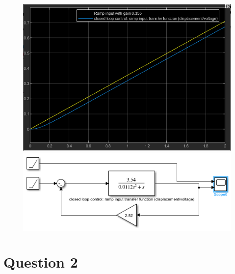 \documentclass[conference]{IEEEtran}
\begin{document}
\begin{figure}[htbp]
    \centering
    \begin{minipage}[b]{0.24\textwidth}
        \includegraphics[width=\textwidth]{./Graph/G9.png}
        \caption{}
        \label{RampInputClosedLoopTR}
    \end{minipage}
    \hfill
    \begin{minipage}[b]{0.24\textwidth}
        \centering
        \includegraphics[width=\textwidth]{./Graph/G9'.png}
        \caption{}
    \end{minipage}
\end{figure}

\section*{Question 2}
\end{document}
